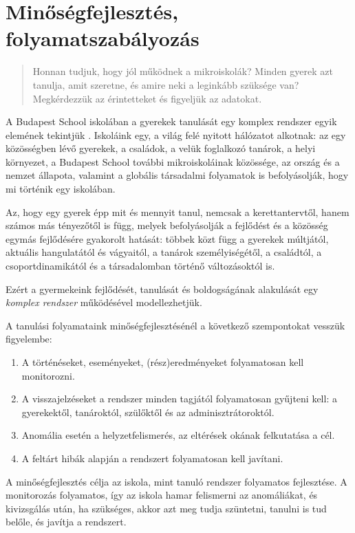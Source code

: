 \section{Minőségfejlesztés, folyamatszabályozás}
\label{sec:minosegbiztositas}
\begin{quote}
      Honnan tudjuk, hogy jól működnek a mikroiskolák? Minden gyerek azt
      tanulja,
      amit szeretne, és amire neki a leginkább szüksége van? Megkérdezzük az
      érintetteket és figyeljük az adatokat.
\end{quote}

A Budapest School iskolában a gyerekek tanulását egy komplex rendszer egyik
elemének tekintjük \citep{barabasi}. Iskoláink egy, a világ felé nyitott
hálózatot alkotnak: az egy közösségben lévő gyerekek, a családok, a velük
foglalkozó tanárok, a helyi környezet, a Budapest School további
mikroiskolái\-nak közössége, az ország és a nemzet állapota, valamint a globális
társadalmi folyamatok is befolyásolják, hogy mi történik egy iskolában.

Az, hogy egy gyerek épp mit és mennyit tanul, nemcsak a kerettantervtől,
hanem számos más tényezőtől is függ, melyek befolyásolják a fejlődést és a
közösség egymás fejlődésére gyakorolt hatását: többek közt függ a gyerekek
múltjától, aktuális hangulatától és vágyaitól, a tanárok személyiségétől, a
családtól, a csoportdinamikától és a társadalomban történő változásoktól
is.

Ezért a gyermekeink fejlődését, tanulását és boldogságának alakulását egy
\emph{komplex rendszer} működésével modellezhetjük.

A tanulási folyamataink minőségfejlesztésénél a következő szempontokat vesszük
figyelembe:
\begin{enumerate}
      \item  A történéseket, eseményeket, (rész)eredményeket folyamatosan kell
            monitorozni.
      \item  A visszajelzéseket a rendszer minden tagjától folyamatosan
            gyűjteni kell: a gyerekektől, tanároktól, szülőktől és az
            adminisztrátoroktól.
      \item Anomália esetén a helyzetfelismerés, az eltérések okának
            felkutatása a
            cél.
      \item A feltárt hibák alapján a rendszert folyamatosan kell javítani.
\end{enumerate}

A minőségfejlesztés célja az iskola, mint tanuló rendszer folyamatos
fejlesztése. A monitorozás folyamatos,
így az iskola hamar  felismerni az anomáliákat, és kivizsgálás után, ha szükséges,
akkor azt meg tudja szüntetni, tanulni is tud belőle, és
javítja a rendszert.

